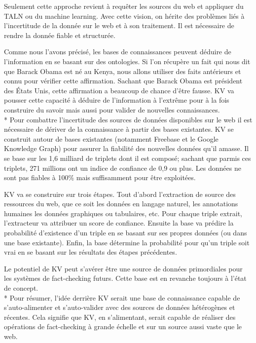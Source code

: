 Seulement cette approche revient à requêter les sources du web et appliquer du TALN ou du machine learning. Avec cette vision, on hérite des problèmes liés à l'incertitude de la donnée sur le web et à son traitement. Il est nécessaire de rendre la donnée fiable et structurée.

Comme nous l'avons précisé, les bases de connaissances peuvent déduire de l'information en se basant sur des ontologies. Si l'on récupère un fait qui nous dit que Barack Obama est né au Kenya, nous allons utiliser des faits antérieurs et connu pour vérifier cette affirmation. Sachant que Barack Obama est président des États Unis, cette affirmation a beaucoup de chance d'être fausse. KV va pousser cette capacité à déduire de l'information à l'extrême pour à la fois construire du savoir mais aussi pour valider de nouvelles connaissances.
\\*
Pour combattre l'incertitude des sources de données disponibles sur le web il est nécessaire de dériver de la connaissance à partir des bases existantes. KV se construit autour de bases existantes (notamment Freebase et le Google Knowledge Graph) pour assurer la fiabilité des nouvelles données qu'il amasse. Il se base sur les 1,6 milliard de triplets dont il est composé; sachant que parmis ces triplets, 271 millions ont un indice de confiance de 0,9 ou plus. Les données ne sont pas fiables à 100\% mais suffisamment pour être exploitées.

KV va se construire sur trois étapes. Tout d'abord l'extraction de source des ressources du web, que ce soit les données en langage naturel, les annotations humaines les données graphiques ou tabulaires, etc. Pour chaque triple extrait, l'extracteur va attribuer un score de confiance. Ensuite la base va prédire la probabilité d'existence d'un triple en se basant sur ses propres données (ou dans une base existante). Enfin, la base détermine la probabilité pour qu'un triple soit vrai en se basant sur les résultats des étapes précédentes.

Le potentiel de KV peut s'avérer être une source de données primordiales pour les systèmes de fact-checking futurs. Cette base est en revanche toujours à l'état de concept.
\\*
Pour résumer, l'idée derrière KV serait une base de connaissance capable de s'auto-alimenter et s'auto-valider avec des sources de données hétérogènes et récentes. Cela signifie que KV, en s'alimentant, serait capable de réaliser des opérations de fact-checking à grande échelle et sur un source aussi vaste que le web.

